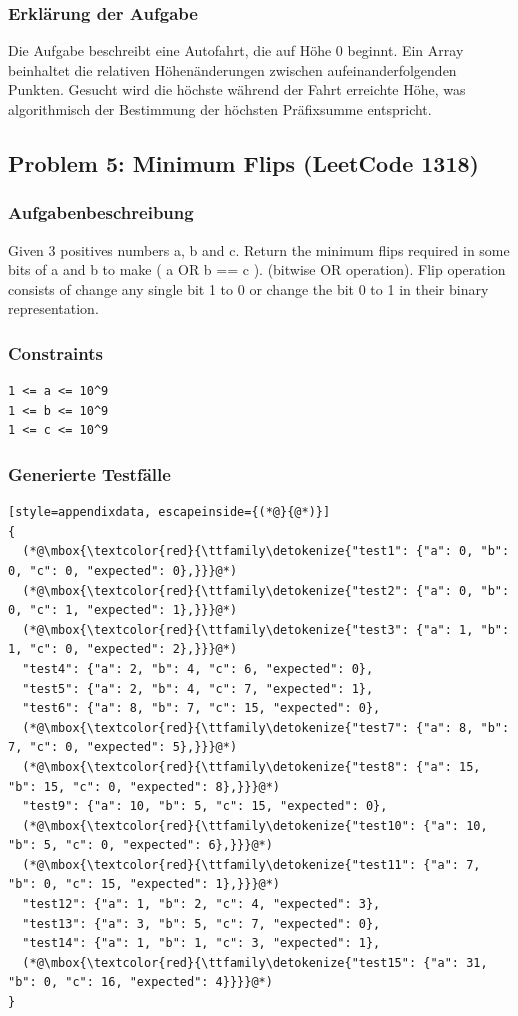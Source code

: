 \subsubsection*{Erklärung der Aufgabe}
Die Aufgabe beschreibt eine Autofahrt, die auf Höhe 0 beginnt. Ein Array beinhaltet die relativen Höhenänderungen zwischen 
aufeinanderfolgenden Punkten. Gesucht wird die höchste während der Fahrt erreichte Höhe, was algorithmisch der Bestimmung der höchsten Präfixsumme entspricht.

\clearpage

\subsection{Problem 5: Minimum Flips (LeetCode 1318)}

\subsubsection*{Aufgabenbeschreibung}
Given 3 positives numbers a, b and c. Return the minimum flips required in some bits of a and b to make ( a OR b == c ). (bitwise OR operation). Flip operation consists of change any single bit 1 to 0 or change the bit 0 to 1 in their binary representation.

\subsubsection*{Constraints}
\begin{lstlisting}[style=appendixdata]
1 <= a <= 10^9
1 <= b <= 10^9
1 <= c <= 10^9
\end{lstlisting}

\subsubsection*{Generierte Testfälle}
\begin{lstlisting}[style=appendixdata, escapeinside={(*@}{@*)}]
{
  (*@\mbox{\textcolor{red}{\ttfamily\detokenize{"test1": {"a": 0, "b": 0, "c": 0, "expected": 0},}}}@*)
  (*@\mbox{\textcolor{red}{\ttfamily\detokenize{"test2": {"a": 0, "b": 0, "c": 1, "expected": 1},}}}@*)
  (*@\mbox{\textcolor{red}{\ttfamily\detokenize{"test3": {"a": 1, "b": 1, "c": 0, "expected": 2},}}}@*)
  "test4": {"a": 2, "b": 4, "c": 6, "expected": 0},
  "test5": {"a": 2, "b": 4, "c": 7, "expected": 1},
  "test6": {"a": 8, "b": 7, "c": 15, "expected": 0},
  (*@\mbox{\textcolor{red}{\ttfamily\detokenize{"test7": {"a": 8, "b": 7, "c": 0, "expected": 5},}}}@*)
  (*@\mbox{\textcolor{red}{\ttfamily\detokenize{"test8": {"a": 15, "b": 15, "c": 0, "expected": 8},}}}@*)
  "test9": {"a": 10, "b": 5, "c": 15, "expected": 0},
  (*@\mbox{\textcolor{red}{\ttfamily\detokenize{"test10": {"a": 10, "b": 5, "c": 0, "expected": 6},}}}@*)
  (*@\mbox{\textcolor{red}{\ttfamily\detokenize{"test11": {"a": 7, "b": 0, "c": 15, "expected": 1},}}}@*)
  "test12": {"a": 1, "b": 2, "c": 4, "expected": 3},
  "test13": {"a": 3, "b": 5, "c": 7, "expected": 0},
  "test14": {"a": 1, "b": 1, "c": 3, "expected": 1},
  (*@\mbox{\textcolor{red}{\ttfamily\detokenize{"test15": {"a": 31, "b": 0, "c": 16, "expected": 4}}}}@*)
}
\end{lstlisting}

